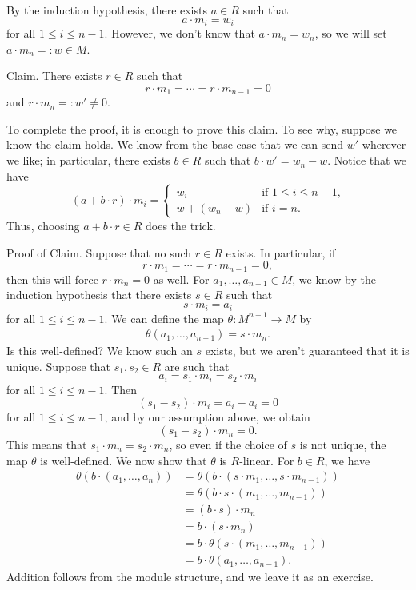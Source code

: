 \begin{enumerate}[(1)]
    By the induction hypothesis, there exists $a \in R$ such that 
    \[ a \cdot m_i = w_i \]
    for all $1 \leq i \leq n-1$. However, we don't know that $a \cdot m_n = w_n$, so we will set 
    $a \cdot m_n =: w \in M$. 
    
    {\sc Claim.} There exists $r \in R$ such that 
    \[ r \cdot m_1 = \cdots = r \cdot m_{n-1} = 0 \]
    and $r \cdot m_n =: w' \neq 0$. 
    
    To complete the proof, it is enough to prove this claim. To see why, suppose we know the claim holds. 
    We know from the base case 
    that we can send $w'$ wherever we like; in particular, there exists $b \in R$ such that 
    $b \cdot w' = w_n - w$. Notice that we have 
    \[ (a + b \cdot r) \cdot m_i = \begin{cases}
    w_i & \text{if $1 \leq i \leq n-1$,} \\ w + (w_n - w) & \text{if $i = n$.} \end{cases} \]
    Thus, choosing $a + b \cdot r \in R$ does the trick.
    
    {\sc Proof of Claim.} Suppose that no such $r \in R$ exists. In particular, if 
    \[ r \cdot m_1 = \cdots = r \cdot m_{n-1} = 0, \]
    then this will force $r \cdot m_n = 0$ as well. For $a_1, \dots, a_{n-1} \in M$, we know by the induction hypothesis that there exists 
    $s \in R$ such that 
    \[ s \cdot m_i = a_i \]
    for all $1 \leq i \leq n-1$. We can define the map $\theta : M^{n-1} \to M$ by 
    \begin{align*}
        \theta(a_1, \dots, a_{n-1}) = s \cdot m_n. 
    \end{align*}  
    Is this well-defined? We know such an $s$ exists, but we aren't guaranteed that it is unique. 
    Suppose that $s_1, s_2 \in R$ are such that 
    \[ a_i = s_1 \cdot m_i = s_2 \cdot m_i \]
    for all $1 \leq i \leq n-1$. Then 
    \[ (s_1 - s_2) \cdot m_i = a_i - a_i = 0 \] 
    for all 
    $1 \leq i \leq n-1$, and by our assumption above, we obtain 
    \[ (s_1 - s_2) \cdot m_n = 0. \]
    This means that $s_1 \cdot m_n = s_2 \cdot m_n$, so even if the choice of $s$ is not unique, the 
    map $\theta$ is well-defined. We now show that $\theta$ is $R$-linear. For $b \in R$, we have 
    \begin{align*}
        \theta(b \cdot (a_1, \dots, a_n)) 
        &= \theta(b \cdot (s \cdot m_1, \dots, s \cdot m_{n-1})) \\
        &= \theta(b \cdot s \cdot (m_1, \dots, m_{n-1})) \\
        &= (b \cdot s) \cdot m_n \\
        &= b \cdot (s \cdot m_n) \\
        &= b \cdot \theta(s \cdot (m_1, \dots, m_{n-1})) \\
        &= b \cdot \theta(a_1, \dots, a_{n-1}).
    \end{align*}
    Addition follows from the module structure, and we leave it as an exercise.
    

\end{enumerate}
